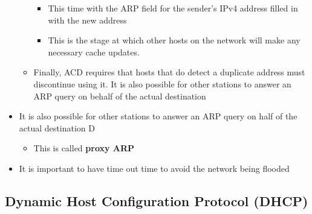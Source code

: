 \documentclass[11pt]{article}
\providecommand{\tightlist}{%
      \setlength{\itemsep}{0pt}\setlength{\parskip}{0pt}}
\begin{document}
\begin{itemize}
\begin{itemize}
    \begin{itemize}
    \tightlist
    \item
      This time with the ARP field for the sender's IPv4 address filled
      in with the new address
    \item
      This is the stage at which other hosts on the network will make
      any necessary cache updates.
    \end{itemize}
  \item
    Finally, ACD requires that hosts that do detect a duplicate address
    must discontinue using it. It is also possible for other stations to
    answer an ARP query on behalf of the actual destination
  \end{itemize}
\item
  It is also possible for other stations to answer an ARP query on half
  of the actual destination D

  \begin{itemize}
  \tightlist
  \item
    This is called \textbf{proxy ARP}
  \end{itemize}
\item
  It is important to have time out time to avoid the network being
  flooded
\end{itemize}

    \subsection{Dynamic Host Configuration Protocol
(DHCP)}\label{dynamic-host-configuration-protocol-dhcp}
\end{document}
